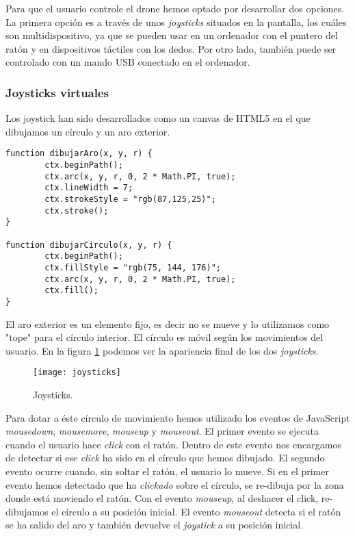 Para que el usuario controle el drone hemos optado por desarrollar dos opciones. La primera opción es a través de unos \emph{joysticks} situados en la pantalla, los cuáles son multidispositivo, ya que se pueden usar en un ordenador con el puntero del ratón y en dispositivos táctiles con los dedos. Por otro lado, también puede ser controlado con un mando USB conectado en el ordenador.\\

\subsubsection{Joysticks virtuales}

Los joystick han sido desarrollados como un canvas de HTML5 en el que dibujamos un círculo y un aro exterior.\\

\begin{lstlisting}[caption=Aro y círculo del joystick.]
function dibujarAro(x, y, r) {
        ctx.beginPath();
        ctx.arc(x, y, r, 0, 2 * Math.PI, true);
        ctx.lineWidth = 7;
        ctx.strokeStyle = "rgb(87,125,25)";
        ctx.stroke();
}

function dibujarCirculo(x, y, r) {
        ctx.beginPath();
        ctx.fillStyle = "rgb(75, 144, 176)";
        ctx.arc(x, y, r, 0, 2 * Math.PI, true);
        ctx.fill();
}
\end{lstlisting}


El aro exterior es un elemento fijo, es decir no se mueve y lo utilizamos como "tope" para el círculo interior. El círculo es móvil según los movimientos del usuario. En la figura \ref{fig:joysticks} podemos ver la apariencia final de los dos \emph{joysticks}.\\

\begin{figure}[h!]
\centering
\texttt{[image: joysticks]}
\caption{Joysticks.}
\label{fig:joysticks}
\end{figure}


Para dotar a éste círculo de movimiento hemos utilizado los eventos de JavaScript \emph{mousedown}, \emph{mousemove}, \emph{mouseup} y \emph{mouseout}. El primer evento se ejecuta cuando el usuario hace \emph{click} con el ratón. Dentro de este evento nos encargamos de detectar si ese \emph{click} ha sido en el círculo que hemos dibujado. El segundo evento ocurre cuando, sin soltar el ratón, el usuario lo mueve. Si en el primer evento hemos detectado que ha \emph{clickado} sobre el círculo, se re-dibuja por la zona donde está moviendo el ratón. Con el evento \emph{mouseup}, al deshacer el click, re-dibujamos el círculo a su posición inicial. El evento \emph{mouseout} detecta si el ratón se ha salido del aro y también devuelve el \emph{joystick} a su posición inicial.\\

